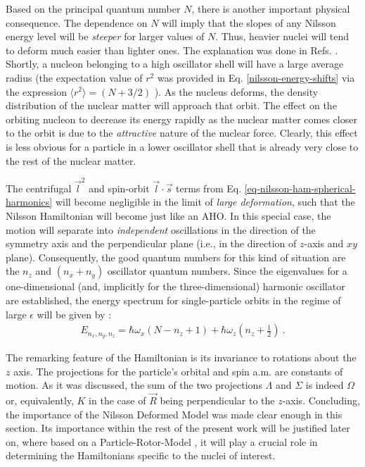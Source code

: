 Based on the principal quantum number $N$, there is another important physical consequence. The dependence on $N$ will imply that the slopes of any Nilsson energy level will be \emph{steeper} for larger values of $N$. Thus, heavier nuclei will tend to deform much easier than lighter ones. The explanation was done in Refs. \cite{bohr1998nuclear,krane1991introductory,casten2000nuclear}. Shortly, a nucleon belonging to a high oscillator shell will have a large average radius (the expectation value of $r^2$ was provided in Eq. \ref{nilsson-energy-shifts} via the expression $\langle r^2 \rangle=(N+3/2)$ \cite{bertulani2007nuclear}). As the nucleus deforms, the density distribution of the nuclear matter will approach that orbit. The effect on the orbiting nucleon to decrease its energy rapidly as the nuclear matter comes closer to the orbit is due to the \emph{attractive} nature of the nuclear force. 
Clearly, this effect is less obvious for a particle in a lower oscillator shell that is already very close to the rest of the nuclear matter.

The centrifugal $\vec{l}^2$ and spin-orbit $\vec{l}\cdot\vec{s}$ terms from Eq. \ref{eq-nilsson-ham-spherical-harmonics} will become negligible in the limit of \emph{large deformation}, such that the Nilsson Hamiltonian will become just like an AHO. In this special case, the motion will separate into \emph{independent} oscillations in the direction of the symmetry axis and the perpendicular plane (i.e., in the direction of $z$-axis and $xy$ plane). Consequently, the good quantum numbers for this kind of situation are the $n_z$ and $(n_x+n_y)$ oscillator quantum numbers. Since the eigenvalues for a one-dimensional (and, implicitly for the three-dimensional) harmonic oscillator are established, the energy spectrum for single-particle orbits in the regime of large $\epsilon$ will be given by \cite{casten2000nuclear}:
\begin{align}
    E_{n_x,n_y,n_z}=\hbar\omega_x(N-n_z+1)+\hbar\omega_z\left(n_z+\frac{1}{2}\right)\ .
\end{align}

The remarking feature of the Hamiltonian is its invariance to rotations about the $z$ axis. The projections for the particle's orbital and spin a.m. are constants of motion. As it was discussed, the sum of the two projections $\Lambda$ and $\Sigma$ is indeed $\Omega$ or, equivalently, $K$ in the case of $\vec{R}$ being perpendicular to the $z$-axis. Concluding, the importance of the Nilsson Deformed Model was made clear enough in this section. Its importance within the rest of the present work will be justified later on, where based on a Particle-Rotor-Model \cite{bohr1998nuclear,davydov1958rotational}, it will play a crucial role in determining the Hamiltonians specific to the nuclei of interest.

